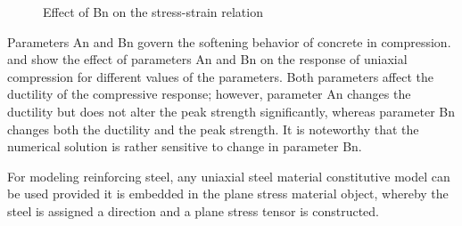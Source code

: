 \begin{figure}[!htbp]
  \caption{ Effect of Bn on the stress-strain relation}
  \label{fig:Bn}
\end{figure}

Parameters An and Bn govern the softening behavior of concrete in compression.  and  show the effect of parameters An and Bn on the response of uniaxial compression for different values of the parameters. 
Both parameters affect the ductility of the compressive response; 
however, parameter An changes the ductility but does not alter the peak strength significantly, 
whereas parameter Bn changes both the ductility and the peak strength. 
It is noteworthy that the numerical solution is rather sensitive to change in parameter Bn.



For modeling reinforcing steel, any uniaxial steel material constitutive model can be used provided it is embedded in the plane stress material object, whereby the steel is assigned a direction and a plane stress tensor is constructed.





